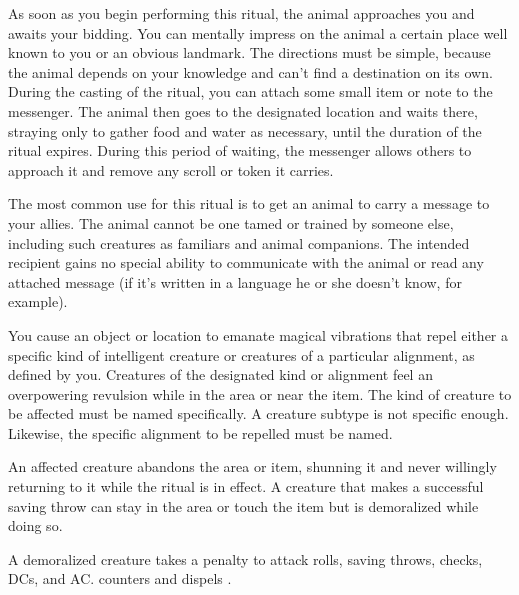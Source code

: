 \spellrng{\rnglong}
\begin{spelleffect}
As soon as you begin performing this ritual, the animal approaches you and awaits your bidding. You can mentally impress on the animal a certain place well known to you or an obvious landmark. The directions must be simple, because the animal depends on your knowledge and can't find a destination on its own. During the casting of the ritual, you can attach some small item or note to the messenger. The animal then goes to the designated location and waits there, straying only to gather food and water as necessary, until the duration of the ritual expires. During this period of waiting, the messenger allows others to approach it and remove any scroll or token it carries.
\end{spelleffect}
\begin{spellnotes}
The most common use for this ritual is to get an animal to carry a message to your allies. The animal cannot be one tamed or trained by someone else, including such creatures as familiars and animal companions. The intended recipient gains no special ability to communicate with the animal or read any attached message (if it's written in a language he or she doesn't know, for example).
\end{spellnotes}

\spellrng{\rngclose}
\begin{spelleffect}
You cause an object or location to emanate magical vibrations that repel either a specific kind of intelligent creature or creatures of a particular alignment, as defined by you. Creatures of the designated kind or alignment feel an overpowering revulsion while in the area or near the item. The kind of creature to be affected must be named specifically. A creature subtype is not specific enough. Likewise, the specific alignment to be repelled must be named.
\par An affected creature abandons the area or item, shunning it and never willingly returning to it while the ritual is in effect. A creature that makes a successful saving throw can stay in the area or touch the item but is demoralized while doing so.
\end{spelleffect}
\begin{spellnotes}
A demoralized creature takes a  penalty to attack rolls, saving throws, checks, DCs, and AC.  counters and dispels .
\end{spellnotes}

